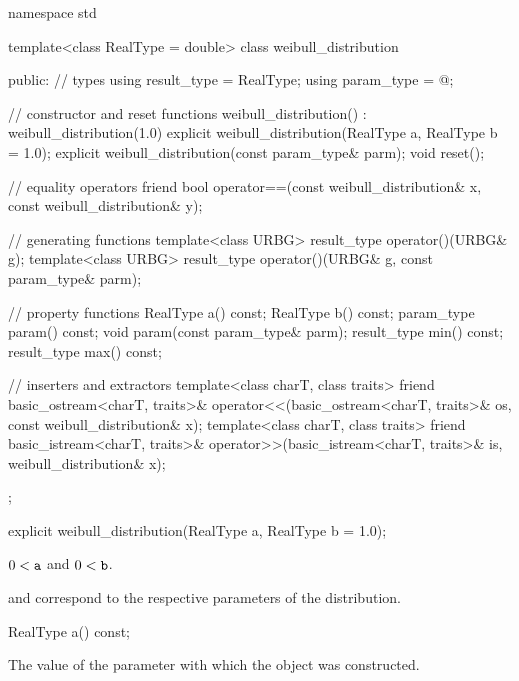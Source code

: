 %
%
\begin{codeblock}
namespace std {
  template<class RealType = double>
  class weibull_distribution {
  public:
    // types
    using result_type = RealType;
    using param_type  = @\unspec@;

    // constructor and reset functions
    weibull_distribution() : weibull_distribution(1.0) {}
    explicit weibull_distribution(RealType a, RealType b = 1.0);
    explicit weibull_distribution(const param_type& parm);
    void reset();

    // equality operators
    friend bool operator==(const weibull_distribution& x, const weibull_distribution& y);

    // generating functions
    template<class URBG>
      result_type operator()(URBG& g);
    template<class URBG>
      result_type operator()(URBG& g, const param_type& parm);

    // property functions
    RealType a() const;
    RealType b() const;
    param_type param() const;
    void param(const param_type& parm);
    result_type min() const;
    result_type max() const;

    // inserters and extractors
    template<class charT, class traits>
      friend basic_ostream<charT, traits>&
        operator<<(basic_ostream<charT, traits>& os, const weibull_distribution& x);
    template<class charT, class traits>
      friend basic_istream<charT, traits>&
        operator>>(basic_istream<charT, traits>& is, weibull_distribution& x);
  };
}
\end{codeblock}

%
\begin{itemdecl}
explicit weibull_distribution(RealType a, RealType b = 1.0);
\end{itemdecl}%

\begin{itemdescr}
\pnum
\expects
$0 < \texttt{\protect a}$ and $0 < \texttt{\protect b}$.

\pnum
\remarks
{} and 
correspond to the respective parameters of the distribution.
\end{itemdescr}

%
\begin{itemdecl}
RealType a() const;
\end{itemdecl}

\begin{itemdescr}
\pnum
\returns
The value of the  parameter
 with which the object was constructed.
\end{itemdescr}

